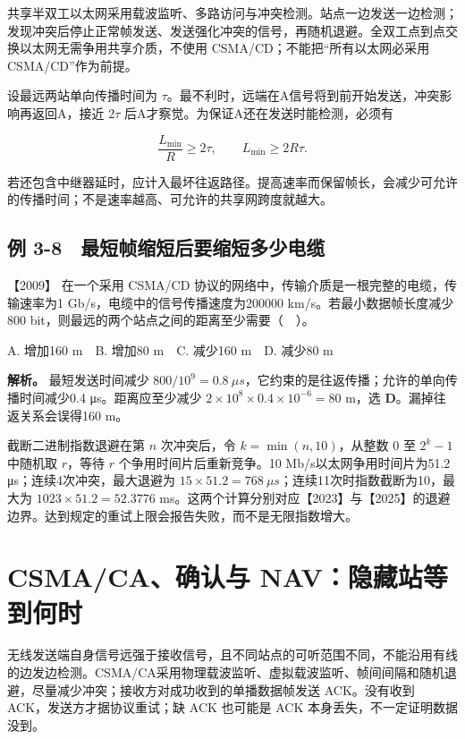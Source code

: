 共享半双工以太网采用载波监听、多路访问与冲突检测。站点一边发送一边检测；发现冲突后停止正常帧发送、发送强化冲突的信号，再随机退避。全双工点到点交换以太网无需争用共享介质，不使用 CSMA/CD；不能把``所有以太网必采用 CSMA/CD''作为前提。

设最远两站单向传播时间为 \(\tau\)。最不利时，远端在A信号将到前开始发送，冲突影响再返回A，接近 \(2\tau\) 后A才察觉。为保证A还在发送时能检测，必须有

\[\frac{L_{\min}}R\ge2\tau,\qquad L_{\min}\ge2R\tau.\]

若还包含中继器延时，应计入最坏往返路径。提高速率而保留帧长，会减少可允许的传播时间；不是速率越高、可允许的共享网跨度就越大。

\subsection{例 3-8　最短帧缩短后要缩短多少电缆}\label{cn-ex3-8}

\noindent{}【2009】 在一个采用 CSMA/CD 协议的网络中，传输介质是一根完整的电缆，传输速率为1 Gb/s，电缆中的信号传播速度为200000 km/s。若最小数据帧长度减少800 bit，则最远的两个站点之间的距离至少需要（　）。

A. 增加160 m　B. 增加80 m　C. 减少160 m　D. 减少80 m


\textbf{解析。} 最短发送时间减少 \(800/10^9=0.8\ \mu s\)，它约束的是往返传播；允许的单向传播时间减少0.4 μs。距离应至少减少 \(2\times10^8\times0.4\times10^{-6}=80\) m，选 \textbf{D}。漏掉往返关系会误得160 m。

截断二进制指数退避在第 \(n\) 次冲突后，令 \(k=\min(n,10)\)，从整数 \(0\) 至 \(2^k-1\) 中随机取 \(r\)，等待 \(r\) 个争用时间片后重新竞争。10 Mb/s以太网争用时间片为51.2 μs；连续4次冲突，最大退避为 \(15\times51.2=768\ \mu s\)；连续11次时指数截断为10，最大为 \(1023\times51.2=52.3776\) ms。这两个计算分别对应【2023】与【2025】的退避边界。达到规定的重试上限会报告失败，而不是无限指数增大。

\section{CSMA/CA、确认与 NAV：隐藏站等到何时}\label{cn-03-12}

无线发送端自身信号远强于接收信号，且不同站点的可听范围不同，不能沿用有线的边发边检测。CSMA/CA采用物理载波监听、虚拟载波监听、帧间间隔和随机退避，尽量减少冲突；接收方对成功收到的单播数据帧发送 ACK。没有收到 ACK，发送方才据协议重试；缺 ACK 也可能是 ACK 本身丢失，不一定证明数据没到。

